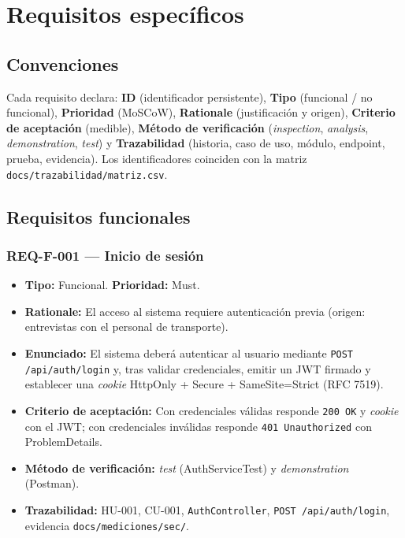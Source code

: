 \documentclass[12pt,a4paper]{article}
\begin{document}
\section{Requisitos específicos}
\label{sec:requisitos}

\subsection{Convenciones}
\label{sec:convenciones}

Cada requisito declara: \textbf{ID} (identificador persistente), \textbf{Tipo} (funcional /
no funcional), \textbf{Prioridad} (MoSCoW), \textbf{Rationale} (justificación y origen),
\textbf{Criterio de aceptación} (medible), \textbf{Método de verificación}
(\textit{inspection}, \textit{analysis}, \textit{demonstration}, \textit{test}) y
\textbf{Trazabilidad} (historia, caso de uso, módulo, endpoint, prueba, evidencia). Los
identificadores coinciden con la matriz \texttt{docs/trazabilidad/matriz.csv}.

\subsection{Requisitos funcionales}
\label{sec:rf}

\subsubsection{REQ-F-001 — Inicio de sesión}
\begin{itemize}
  \item \textbf{Tipo:} Funcional. \textbf{Prioridad:} Must.
  \item \textbf{Rationale:} El acceso al sistema requiere autenticación previa (origen:
  entrevistas con el personal de transporte).
  \item \textbf{Enunciado:} El sistema deberá autenticar al usuario mediante
  \texttt{POST /api/auth/login} y, tras validar credenciales, emitir un JWT firmado y
  establecer una \textit{cookie} HttpOnly + Secure + SameSite=Strict (RFC 7519).
  \item \textbf{Criterio de aceptación:} Con credenciales válidas responde \texttt{200 OK} y
  \textit{cookie} con el JWT; con credenciales inválidas responde \texttt{401 Unauthorized}
  con ProblemDetails.
  \item \textbf{Método de verificación:} \textit{test} (AuthServiceTest) y
  \textit{demonstration} (Postman).
  \item \textbf{Trazabilidad:} HU-001, CU-001, \texttt{AuthController},
  \texttt{POST /api/auth/login}, evidencia \texttt{docs/mediciones/sec/}.
\end{itemize}
\end{document}
